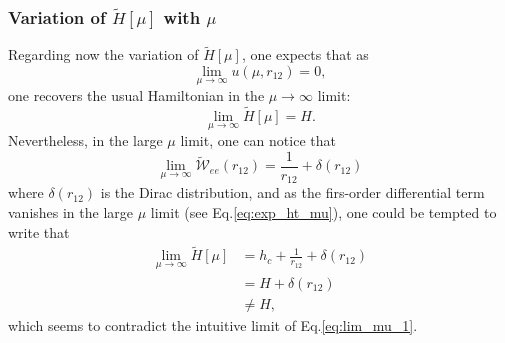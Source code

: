 \documentclass[aip,jcp,reprint,noshowkeys,superscriptaddress]{revtex4-1}
\begin{document}
\subsubsection{Variation of $\tilde{H}[\mu]$ with $\mu$}
\label{sec:h_mu_lim}
Regarding now the variation of $\tilde{H}[\mu]$, one expects that as 
\begin{equation}
 \label{eq:lim_mu_0}
 \lim_{\mu  \rightarrow \infty }u(\mu,r_{12}) = 0, 
\end{equation}
one recovers the usual Hamiltonian in the ${\mu  \rightarrow \infty }$ limit:
\begin{equation}
 \label{eq:lim_mu_1}
 \lim_{\mu \rightarrow \infty} \tilde{H}[\mu] = H.
\end{equation}
Nevertheless, in the large $\mu$ limit, one can notice that 
\begin{equation}
 \label{eq:lim_mu_3}
 \lim_{\mu \rightarrow \infty} \tilde{\mathcal{W}}_{ee}(r_{12})  = \frac{1}{r_{12}} + \delta(r_{12}) 
\end{equation}
where $\delta(r_{12})$ is the Dirac distribution, and as the firs-order differential term vanishes in the large $\mu$ limit (see Eq.\eqref{eq:exp_ht_mu}), one could be tempted to write that 
\begin{equation}
 \begin{aligned}
 \label{eq:lim_mu_4}
 \lim_{\mu \rightarrow \infty} \tilde{H}[\mu]& = h_c + \frac{1}{r_{12}} + \delta(r_{12}) \\
                                             & = H + \delta(r_{12})  \\
                                             & \ne H,
 \end{aligned}
\end{equation}
which seems to contradict the intuitive limit of Eq.\eqref{eq:lim_mu_1}. 
\end{document}
